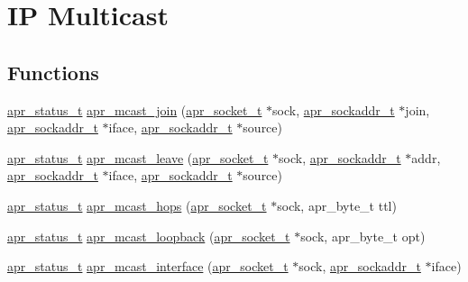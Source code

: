 \hypertarget{group__apr__mcast}{\section{I\-P Multicast}
\label{group__apr__mcast}
}
\subsection*{Functions}
\begin{DoxyCompactItemize}
\item 
\hyperlink{group__apr__errno_gaf76ee4543247e9fb3f3546203e590a6c}{apr\-\_\-status\-\_\-t} \hyperlink{group__apr__mcast_ga731894962f9b20b2ee3ccd057053ef71}{apr\-\_\-mcast\-\_\-join} (\hyperlink{group__apr__network__io_ga49262b223e7434746e1f1737659aa2c3}{apr\-\_\-socket\-\_\-t} $\ast$sock, \hyperlink{structapr__sockaddr__t}{apr\-\_\-sockaddr\-\_\-t} $\ast$join, \hyperlink{structapr__sockaddr__t}{apr\-\_\-sockaddr\-\_\-t} $\ast$iface, \hyperlink{structapr__sockaddr__t}{apr\-\_\-sockaddr\-\_\-t} $\ast$source)
\item 
\hyperlink{group__apr__errno_gaf76ee4543247e9fb3f3546203e590a6c}{apr\-\_\-status\-\_\-t} \hyperlink{group__apr__mcast_gadd3d59b5f628786093277b962c863d13}{apr\-\_\-mcast\-\_\-leave} (\hyperlink{group__apr__network__io_ga49262b223e7434746e1f1737659aa2c3}{apr\-\_\-socket\-\_\-t} $\ast$sock, \hyperlink{structapr__sockaddr__t}{apr\-\_\-sockaddr\-\_\-t} $\ast$addr, \hyperlink{structapr__sockaddr__t}{apr\-\_\-sockaddr\-\_\-t} $\ast$iface, \hyperlink{structapr__sockaddr__t}{apr\-\_\-sockaddr\-\_\-t} $\ast$source)
\item 
\hyperlink{group__apr__errno_gaf76ee4543247e9fb3f3546203e590a6c}{apr\-\_\-status\-\_\-t} \hyperlink{group__apr__mcast_ga373041d43cb0fd05b2974b9fef0ae30f}{apr\-\_\-mcast\-\_\-hops} (\hyperlink{group__apr__network__io_ga49262b223e7434746e1f1737659aa2c3}{apr\-\_\-socket\-\_\-t} $\ast$sock, apr\-\_\-byte\-\_\-t ttl)
\item 
\hyperlink{group__apr__errno_gaf76ee4543247e9fb3f3546203e590a6c}{apr\-\_\-status\-\_\-t} \hyperlink{group__apr__mcast_ga84bc14970499f79de8b71d77898f68ee}{apr\-\_\-mcast\-\_\-loopback} (\hyperlink{group__apr__network__io_ga49262b223e7434746e1f1737659aa2c3}{apr\-\_\-socket\-\_\-t} $\ast$sock, apr\-\_\-byte\-\_\-t opt)
\item 
\hyperlink{group__apr__errno_gaf76ee4543247e9fb3f3546203e590a6c}{apr\-\_\-status\-\_\-t} \hyperlink{group__apr__mcast_ga9949eb40d8bfb670f9bce997cebcdcae}{apr\-\_\-mcast\-\_\-interface} (\hyperlink{group__apr__network__io_ga49262b223e7434746e1f1737659aa2c3}{apr\-\_\-socket\-\_\-t} $\ast$sock, \hyperlink{structapr__sockaddr__t}{apr\-\_\-sockaddr\-\_\-t} $\ast$iface)
\end{DoxyCompactItemize}


